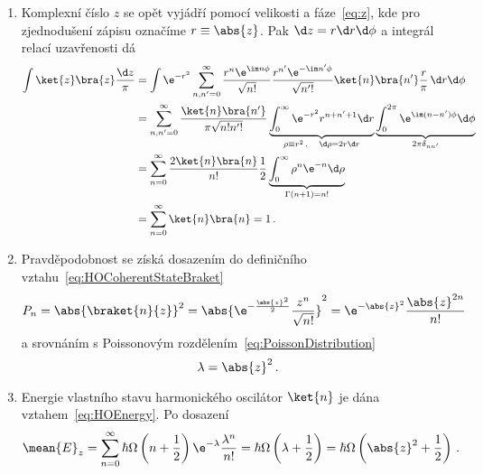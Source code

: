 \begin{solution}
\begin{enumerate}
	\item
		Komplexní číslo $z$ se opět vyjádří pomocí velikosti a fáze~\eqref{eq:z}, 
		kde pro zjednodušení zápisu označíme $r\equiv\abs{z}$.
		Pak $\d z=r\d r\d\phi$ a integrál relací uzavřenosti dá
		\begin{align}
			\int\ket{z}\bra{z}\frac{\d z}{\pi}
				&=\int\e^{-r^{2}}\sum_{n,n'=0}^{\infty}\frac{r^{n}\e^{\im n\phi}}{\sqrt{n!}}
					\frac{r^{n'}\e^{-\im n'\phi}}{\sqrt{n'!}}\ket{n}\bra{n'}
					\frac{r}{\pi}\,\d r\d\phi\nonumber\\
				&=\sum_{n,n'=0}^{\infty}\frac{\ket{n}\bra{n'}}{\pi\sqrt{n!n'!}}
					\underbrace{\int_{0}^{\infty}\e^{-r^{2}}r^{n+n'+1}\d r}_{\rho\equiv r^{2}\,,
					\quad\d\rho=2r\d r}
					\underbrace{\int_{0}^{2\pi}\e^{\im(n-n')\phi}\d\phi}_{2\pi\delta_{nn'}}\nonumber\\
				&=\sum_{n=0}^{\infty}\frac{2\ket{n}\bra{n}}{n!}\frac{1}{2}
					\underbrace{\int_{0}^{\infty}\rho^{n}\e^{-n}\d\rho}_{\Gamma(n+1)=n!}\nonumber\\
				&=\sum_{n=0}^{\infty}\ket{n}\bra{n}=1\,.
		\end{align}
		
	\item
		Pravděpodobnost se získá dosazením do definičního vztahu~\eqref{eq:HOCoherentStateBraket}
		\begin{equation}
			P_{n}
				=\abs{\braket{n}{z}}^{2}
				=\abs{\e^{-\frac{\abs{z}^{2}}{2}}\frac{z^{n}}{\sqrt{n!}}}^{2}\nonumber\\
				=\e^{-\abs{z}^{2}}\frac{\abs{z}^{2n}}{n!}
		\end{equation}
		a srovnáním s Poissonovým rozdělením~\eqref{eq:PoissonDistribution}
		\begin{equation}
			\lambda=\abs{z}^{2}\,.
		\end{equation}			
		
	\item
		Energie vlastního stavu harmonického oscilátor $\ket{n}$ je dána vztahem~\eqref{eq:HOEnergy}.
		Po dosazení
		\begin{equation}
			\label{eq:HOmeanE}
			\mean{E}_{z}				
				=\sum_{n=0}^{\infty}\hbar\Omega\left(n+\frac{1}{2}\right)\e^{-\lambda}
					\frac{\lambda^{n}}{n!}
				=\hbar\Omega\left(\lambda+\frac{1}{2}\right)
				=\hbar\Omega\left(\abs{z}^{2}+\frac{1}{2}\right)\,.
		\end{equation}	
	\end{enumerate}
\end{solution}
